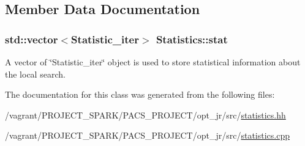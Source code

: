 \subsection{Member Data Documentation}
\hypertarget{classStatistics_a7b3e8290fbe506b88f7421a2479d258f}{
\subsubsection[{stat}]{\setlength{\rightskip}{0pt plus 5cm}std\-::vector$<${\bf Statistic\-\_\-iter}$>$ Statistics\-::stat\hspace{0.3cm}{\ttfamily [private]}}}\label{classStatistics_a7b3e8290fbe506b88f7421a2479d258f}
A vector of \char`\"{}\-Statistic\-\_\-iter\char`\"{} object is used to store statistical information about the local search. 

The documentation for this class was generated from the following files\-:\begin{DoxyCompactItemize}
\item 
/vagrant/\-P\-R\-O\-J\-E\-C\-T\-\_\-\-S\-P\-A\-R\-K/\-P\-A\-C\-S\-\_\-\-P\-R\-O\-J\-E\-C\-T/opt\-\_\-jr/src/\hyperlink{statistics_8hh}{statistics.\-hh}\item 
/vagrant/\-P\-R\-O\-J\-E\-C\-T\-\_\-\-S\-P\-A\-R\-K/\-P\-A\-C\-S\-\_\-\-P\-R\-O\-J\-E\-C\-T/opt\-\_\-jr/src/\hyperlink{statistics_8cpp}{statistics.\-cpp}\end{DoxyCompactItemize}
